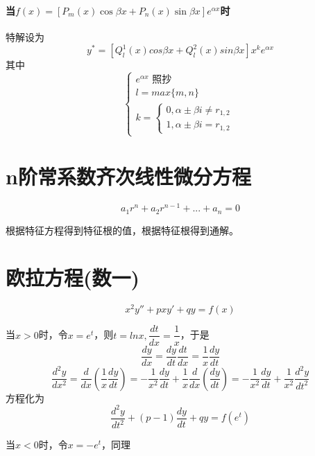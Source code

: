 \paragraph{当\(f(x) = [P_m(x)\cos\beta x + P_n(x)\sin\beta x]e^{\alpha x}\)时}
特解设为
\[y^* = [Q_l^1(x)cos\beta x + Q_l^2(x)sin\beta x]x^ke^{\alpha x}\]
其中
\[\begin{cases}
    e^{\alpha x}\text{ 照抄} \\ 
    l = max\{m, n\} \\ 
    k = \begin{cases}
        0, \alpha \pm \beta i \neq r_{1,2} \\ 
        1, \alpha \pm \beta i = r_{1,2}
    \end{cases}
\end{cases}\]


\section{n阶常系数齐次线性微分方程}
\[a_1r^n + a_2r^{n - 1} + ... + a_n = 0\]

根据特征方程得到特征根的值，根据特征根得到通解。


\section{欧拉方程(数一)}
\[x^2y'' + pxy' + qy = f(x)\]

当\(x > 0\)时，令\(x = e^t\)，则\(t = lnx, \dfrac{dt}{dx} = \dfrac{1}{x}\)，于是
\[\dfrac{dy}{dx} = \dfrac{dy}{dt} \dfrac{dt}{dx} = \dfrac{1}{x} \dfrac{dy}{dt}\]
\[\dfrac{d^2y}{dx^2} = \dfrac{d}{dx}(\dfrac{1}{x}\dfrac{dy}{dt}) = -\dfrac{1}{x^2}\dfrac{dy}{dt} + \dfrac{1}{x}\dfrac{d}{dx}(\dfrac{dy}{dt}) = -\dfrac{1}{x^2}\dfrac{dy}{dt} + \dfrac{1}{x^2}\dfrac{d^2y}{dt^2}\]
方程化为\[\dfrac{d^2y}{dt^2} + (p - 1)\dfrac{dy}{dt} + qy = f(e^t)\]

当\(x < 0\)时，令\(x = -e^t\)，同理


